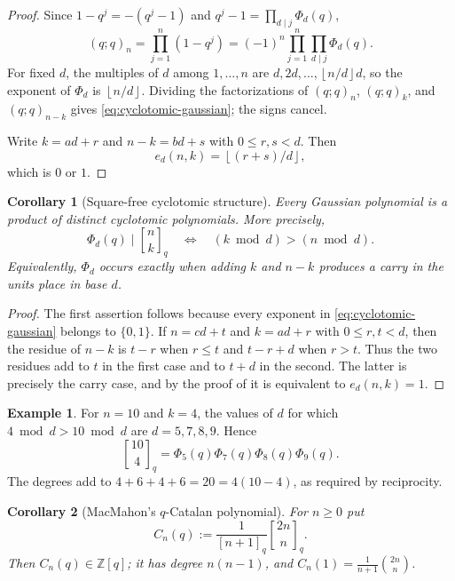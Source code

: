 \documentclass[11pt,oneside,openany]{book}
\newtheorem{corollary}[corollary]{Corollary}
\theoremstyle{definition}
\newtheorem{example}[example]{Example}
\theoremstyle{remark}
\newcommand{\qbinom}[2]{\genfrac{[}{]}{0pt}{}{#1}{#2}_{q}}
\newcommand{\qint}[1]{[#1]_q}
\newcommand{\Z}{\mathbb Z}
\newcommand{\floor}[1]{\left\lfloor #1\right\rfloor}
\newcommand{\defeq}{\mathrel{:=}}
\begin{document}
\begin{proof}
Since $1-q^j=-(q^j-1)$ and $q^j-1=\prod_{d\mid j}\Phi_d(q)$,
\[
 (q;q)_n
 =\prod_{j=1}^{n}(1-q^j)
 =(-1)^n\prod_{j=1}^{n}\prod_{d\mid j}\Phi_d(q).
\]
For fixed $d$, the multiples of $d$ among $1,\ldots,n$ are $d,2d,\ldots,\floor{n/d}d$, so the exponent of $\Phi_d$ is $\floor{n/d}$.  Dividing the factorizations of $(q;q)_n$, $(q;q)_k$, and $(q;q)_{n-k}$ gives \eqref{eq:cyclotomic-gaussian}; the signs cancel.

Write $k=ad+r$ and $n-k=bd+s$ with $0\le r,s<d$.  Then
\[
 e_d(n,k)=\floor{(r+s)/d},
\]
which is $0$ or $1$.
\end{proof}

\begin{corollary}[Square-free cyclotomic structure]\label{cor:squarefree-cyclotomic}
Every Gaussian polynomial is a product of distinct cyclotomic polynomials.  More precisely,
\[
 \Phi_d(q)\mid\qbinom nk
 \quad\Longleftrightarrow\quad
 (k\bmod d)> (n\bmod d).
 \tag{16.2}\label{eq:carry-criterion}
\]
Equivalently, $\Phi_d$ occurs exactly when adding $k$ and $n-k$ produces a carry in the units place in base $d$.
\end{corollary}

\begin{proof}
The first assertion follows because every exponent in \eqref{eq:cyclotomic-gaussian} belongs to $\{0,1\}$.  If $n=cd+t$ and $k=ad+r$ with $0\le r,t<d$, then the residue of $n-k$ is $t-r$ when $r\le t$ and $t-r+d$ when $r>t$.  Thus the two residues add to $t$ in the first case and to $t+d$ in the second.  The latter is precisely the carry case, and by the proof of  it is equivalent to $e_d(n,k)=1$.
\end{proof}

\begin{example}
For $n=10$ and $k=4$, the values of $d$ for which $4\bmod d>10\bmod d$ are $d=5,7,8,9$.  Hence
\[
 \qbinom{10}{4}=\Phi_5(q)\Phi_7(q)\Phi_8(q)\Phi_9(q).
\]
The degrees add to $4+6+4+6=20=4(10-4)$, as required by reciprocity.
\end{example}

\begin{corollary}[MacMahon's $q$-Catalan polynomial]\label{cor:q-catalan}
For $n\ge0$ put
\[
 C_n(q)\defeq\frac1{\qint{n+1}}\qbinom{2n}{n}.
\]
Then $C_n(q)\in\Z[q]$; it has degree $n(n-1)$, and $C_n(1)=\frac1{n+1}\binom{2n}{n}$.
\end{corollary}
\end{document}

